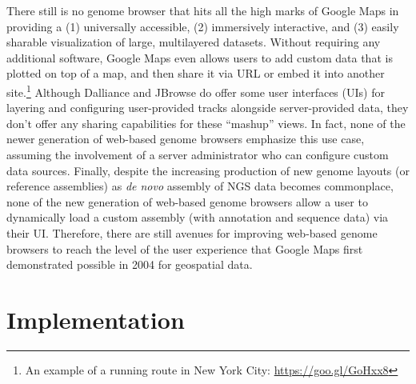 There still is no genome browser that hits all the high marks of Google Maps in providing a (1) universally accessible, (2) immersively interactive, and (3) easily sharable visualization of large, multilayered datasets. Without requiring any additional software, Google Maps even allows users to add custom data that is plotted on top of a map, and then share it via URL or embed it into another site.\footnote{An example of a running route in New York City: \url{https://goo.gl/GoHxx8}} Although Dalliance and JBrowse do offer some user interfaces (UIs) for layering and configuring user-provided tracks alongside server-provided data, they don't offer any sharing capabilities for these ``mashup'' views. In fact, none of the newer generation of web-based genome browsers emphasize this use case, assuming the involvement of a server administrator who can configure custom data sources. Finally, despite the increasing production of new genome layouts (or reference assemblies) as \emph{de novo} assembly of NGS data becomes commonplace, none of the new generation of web-based genome browsers allow a user to dynamically load a custom assembly (with annotation and sequence data) via their UI. Therefore, there are still avenues for improving web-based genome browsers to reach the level of the user experience that Google Maps first demonstrated possible in 2004 for geospatial data.\autocite{Vincent2007}

\section{Implementation}

